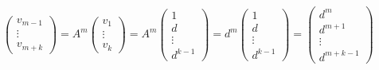 $\begin{pmatrix}
v_{m-1} \\ \vdots \\ v_{m+k}
\end{pmatrix}
= A^m \begin{pmatrix}
v_1 \\\vdots\\v_k
\end{pmatrix}
= A^m \begin{pmatrix}
1 \\ d\\ \vdots \\d^{k-1}
\end{pmatrix}
= d^m \begin{pmatrix}
1 \\ d \\\vdots \\d^{k-1}
\end{pmatrix}
= \begin{pmatrix}
d^m \\ d^{m+1} \\\vdots \\d^{m+k-1}
\end{pmatrix}
$


















